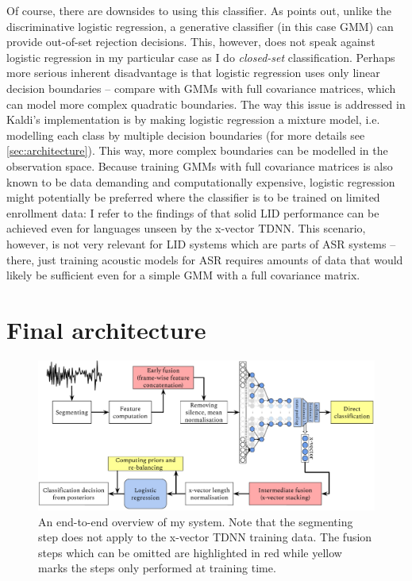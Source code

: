\documentclass[bsc,frontabs,twoside,singlespacing,parskip,deptreport]{infthesis}
\begin{document}
{{    %
    Of course, there are downsides to using this classifier. As \citet{McCree_2014} points out, unlike the discriminative logistic regression, a generative classifier (in this case GMM) can provide out-of-set rejection decisions. This, however, does not speak against logistic regression in my particular case as I do \textit{closed-set} classification. Perhaps more serious inherent disadvantage is that logistic regression uses only linear decision boundaries -- compare with GMMs with full covariance matrices, which can model more complex quadratic boundaries. The way this issue is addressed in Kaldi's implementation is by making logistic regression a mixture model, i.e. modelling each class by multiple decision boundaries (for more details see \autoref{sec:architecture}). This way, more complex boundaries can be modelled in the observation space. Because training GMMs with full covariance matrices is also known to be data demanding and computationally expensive, logistic regression might potentially be preferred where the classifier is to be trained on limited enrollment data: I refer to the findings of \citeauthor{Snyder_et_al_2018} that solid LID performance can be achieved even for languages unseen by the x-vector TDNN. This scenario, however, is not very relevant for LID systems which are parts of ASR systems -- there, just training acoustic models for ASR requires amounts of data that would likely be sufficient even for a simple GMM with a full covariance matrix.
  }

  \section{Final architecture}{
    \label{sec:architecture}

    \begin{figure}[h!]
      \centering
      \includegraphics[width=15cm]{graphics/architecture}
      \vspace*{-1em}
      \caption{An end-to-end overview of my system. Note that the segmenting step does not apply to the x-vector TDNN training data. The fusion steps which can be omitted are highlighted in red while yellow marks the steps only performed at training time.}
      \label{fig:architecture}
    \end{figure}

}}
\end{document}
